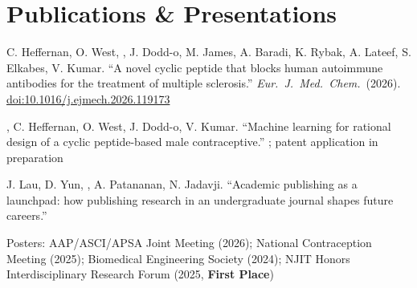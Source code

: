 \documentclass[a4paper,11pt]{article}  %
\begin{document}
\section{Publications \& Presentations}
\begin{publist}
  \item C. Heffernan, O. West, , J. Dodd-o, M. James, A. Baradi, K. Rybak, A. Lateef, S. Elkabes, V. Kumar.
        ``A novel cyclic peptide that blocks human autoimmune antibodies for the treatment of multiple sclerosis.''
        \emph{Eur.\ J.\ Med.\ Chem.}\ (2026).
        \href{https://doi.org/10.1016/j.ejmech.2026.119173}{doi:10.1016/j.ejmech.2026.119173}
  \item {}, C. Heffernan, O. West, J. Dodd-o, V. Kumar.
        ``Machine learning for rational design of a cyclic peptide-based male contraceptive.''
        ; patent application in preparation
  \item J. Lau, D. Yun, , A. Patananan, N. Jadavji.
        ``Academic publishing as a launchpad: how publishing research in an undergraduate journal shapes future careers.''
\end{publist}

     {Posters: AAP/ASCI/APSA Joint Meeting (2026); National Contraception Meeting (2025); Biomedical Engineering Society (2024); NJIT Honors Interdisciplinary Research Forum (2025, \textbf{First Place})}

\end{document}
